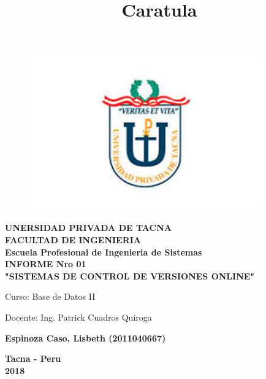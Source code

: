 \documentclass[12pt,spanish]{article}
\begin{document}
\title{Caratula}


\begin{titlepage}

\begin{figure}[htb]
\begin{center}
\includegraphics[width=10cm]{./Imagenes/logo}
\end{center}
\end{figure}

\begin{center}
\vspace*{-0.5in}
\LARGE{\textbf{\bf UNERSIDAD PRIVADA DE TACNA}}\\

\vspace*{0.25in}
\large{\textbf{\bf FACULTAD DE INGENIERIA}}\\

\vspace*{0.15in}
\large{\textbf{\bf Escuela Profesional de Ingenieria de Sistemas}}\\


\vspace*{0.5in}
\Large{\textbf{\bf INFORME Nro 01}}\\
\Large{\textbf{\bf "SISTEMAS DE CONTROL DE VERSIONES ONLINE"}}\\

\vspace*{0.6in}
\begin{Large}
Curso: Base de Datos II \\
\end{Large}

\vspace*{0.3in}
\begin{Large}
Docente: Ing. Patrick Cuadros Quiroga \\
\end{Large}

\vspace*{0.5in}
\begin{large}
\textbf{\bf Espinoza Caso, Lisbeth  (2011040667)}\\
\end{large}

\vspace*{1.5in}
\begin{large}
\textbf{\bf Tacna - Peru}\\
\textbf{\bf 2018}\\
\end{large}

\end{center}

\end{titlepage}
\end{document}
